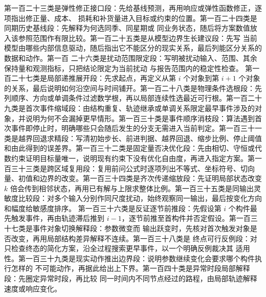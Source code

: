 第一百二十三类是弹性修正接口段：先给基线预测，再用响应或弹性函数修正，逐项指出修正量、成本、
损耗和补货量进入目标或约束的位置。第一百二十四类是同期历史基线段：先解释为何选同季、同星期或
同业务状态，随后将方案数值放入该参照范围作有限比较。第一百二十五类是从模型边界生长建议段：先写
当前模型由哪些内部信息驱动，随后指出它不能区分的现实关系，最后列能区分关系的数据和动作。第一百
二十六类是扰动范围限定段：写明被扰动输入、范围、其余保持量和观测指标，只把结论限定为当前扰动
与报告范围内的稳定性检查。
第一百二十七类是局部递推展开段：先求起点，再定义从第 $i$ 个对象到第 $i+1$ 个对象的关系，最后说明如何沿空间与时间铺开。第一百二十八类是物理条件选根段：先列顺序、方向或单调条件过滤数学根，再以局部连续性选最近可行根。第一百二十九类是首次事件缩域段：由结构重复、轨迹继承或单调关系限定最早事件涉及的对象，并说明为何不会漏掉更早情形。第一百三十类是事件顺序消枝段：算法遇到首次事件即停止时，明确哪些只会随后发生的分支无需进入当前判定。第一百三十一类是越界回退求精段：写清初始步长、前进判据、越界回退、缩步比例、停止阈值和由此得到的误差界。第一百三十二类是固定量否决优化段：先由相切、守恒或代数约束证明目标量唯一，说明现有约束下没有优化自由度，再进入指定方案。第一百三十三类是跨区域复用段：复用前问公式时逐项列出不等式、坐标符号、切向量、初值和边界的改变。第一百三十四类是齐次传递缩放段：先证明局部状态改变 $k$ 倍会传到相邻状态，再用已有解与上限求整体比例。第一百三十五类是同输出灵敏度比较段：对多个输入分别作同尺度扰动，始终观察同一输出，最后按变化方向和幅度给敏感度排序。
第一百三十六类是反证逐节前推段：先假设第 $i$ 个构件最先触发事件，再由轨迹滞后推到
$i-1$，逐节前推至首构件并否定假设。第一百三十七类是事件对象切换解释段：参数微变而
输出跃变时，先核对首次触发对象是否改变，再用局部结构差异解释不连续。第一百三十八类是
终点可行反例段：对只检查终态的简化方案，沿全过程搜索更早事件，以一个明确反例裁决其
适用性。第一百三十九类是现实动作推出边界段：说明参数继续变化会要求哪个构件执行怎样的
不可能动作，再据此给出上下界。第一百四十类是异常时段局部解释段：先圈定异常时段，再比较
同一时间内不同节点经过的路程，由局部轨迹解释速度或响应变化。

